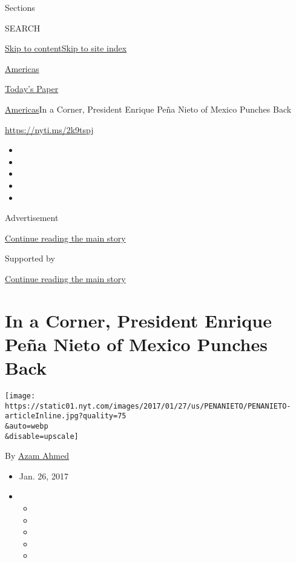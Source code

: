 Sections

SEARCH

\protect\hyperlink{site-content}{Skip to
content}\protect\hyperlink{site-index}{Skip to site index}

\href{https://www.nytimes.com/section/world/americas}{Americas}

\href{https://myaccount.nytimes.com/auth/login?response_type=cookie\&client_id=vi}{}

\href{https://www.nytimes.com/section/todayspaper}{Today's Paper}

\href{/section/world/americas}{Americas}\textbar{}In a Corner, President
Enrique Peña Nieto of Mexico Punches Back

\url{https://nyti.ms/2k9tspj}

\begin{itemize}
\item
\item
\item
\item
\item
\end{itemize}

Advertisement

\protect\hyperlink{after-top}{Continue reading the main story}

Supported by

\protect\hyperlink{after-sponsor}{Continue reading the main story}

\hypertarget{in-a-corner-president-enrique-peuxf1a-nieto-of-mexico-punches-back}{%
\section{In a Corner, President Enrique Peña Nieto of Mexico Punches
Back}\label{in-a-corner-president-enrique-peuxf1a-nieto-of-mexico-punches-back}}

\texttt{[image: https://static01.nyt.com/images/2017/01/27/us/PENANIETO/PENANIETO-articleInline.jpg?quality=75\\\&auto=webp\\\&disable=upscale]}

By \href{http://www.nytimes.com/by/azam-ahmed}{Azam Ahmed}

\begin{itemize}
\item
  Jan. 26, 2017
\item
  \begin{itemize}
  \item
  \item
  \item
  \item
  \item
  \end{itemize}
\end{itemize}


